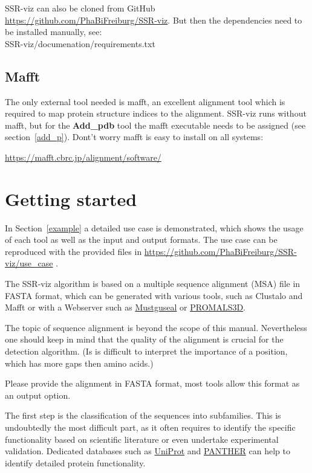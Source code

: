 \documentclass[a4paper,10pt]{article}
\begin{document}
SSR-viz can also be cloned from GitHub \url{https://github.com/PhaBiFreiburg/SSR-viz}.
But then the dependencies need to be installed manually, 
see: \\
SSR-viz/documenation/requirements.txt

\subsection{Mafft}

The only external tool needed is mafft, an excellent alignment tool which is 
required to map protein structure indices to the alignment. SSR-viz runs
without mafft, but for the \textbf{Add\_pdb} tool the mafft executable needs 
to be assigned (see section~\ref{add_p}).
Dont't worry mafft is easy to install on all systems:

\url{https://mafft.cbrc.jp/alignment/software/}

\section{Getting started}

In Section~\ref{example} a detailed use case is demonstrated, which shows
the usage of each tool as well as the input and output formats.
The use case can be reproduced with the provided files in
 \url{https://github.com/PhaBiFreiburg/SSR-viz/use_case} .

The SSR-viz algorithm is based on a multiple sequence alignment (MSA) file in 
FASTA format, which can be generated with various tools, such as Clustalo 
and Mafft or with a Webserver such as 
\href{https://zeus.cmm.msu.ru/#scenario=2}{Mustguseal} or 
\href{http://prodata.swmed.edu/promals3d/promals3d.php}{PROMALS3D}.

The topic of sequence alignment is beyond the scope of this manual.  
Nevertheless one should keep in mind that 
the quality of the alignment is crucial for the detection algorithm.
(Is is difficult to interpret the importance of a position, which has
more gaps then amino acids.)

Please provide the alignment in FASTA format, most tools allow this format as
an output option.

The first step is the classification of the sequences into subfamilies.
This is undoubtedly the most difficult part, as it often requires 
to identify the specific functionality based on scientific literature
or even undertake experimental validation. Dedicated databases such as 
\href{https://www.uniprot.org/}{UniProt} and \href{http://www.pantherdb.org/downloads/index.jsp}{PANTHER} 
can help to identify 
detailed protein functionality. 
\end{document}
